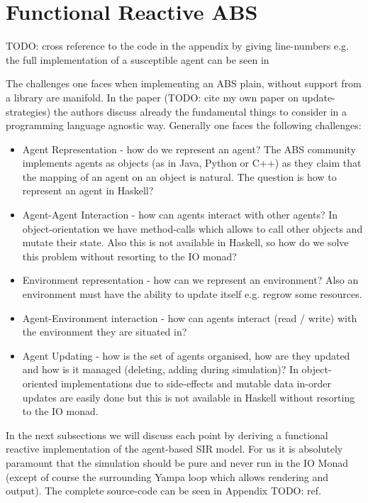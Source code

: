 \section{Functional Reactive ABS}
TODO: cross reference to the code in the appendix by giving line-numbers e.g. the full implementation of a susceptible agent can be seen in

The challenges one faces when implementing an ABS plain, without support from a library are manifold. In the paper (TODO: cite my own paper on update-strategies) the authors discuss already the fundamental things to consider in a programming language agnostic way.  Generally one faces the following challenges:

\begin{itemize}
	\item Agent Representation - how do we represent an agent? The ABS community implements agents as objects (as in Java, Python or C++) as they claim that the mapping of an agent on an object is natural. The question is how to represent an agent in Haskell?
	\item Agent-Agent Interaction - how can agents interact with other agents? In object-orientation we have method-calls which allows to call other objects and mutate their state. Also this is not available in Haskell, so how do we solve this problem without resorting to the IO monad?
	\item Environment representation - how can we represent an environment? Also an environment must have the ability to update itself e.g. regrow some resources.
	\item Agent-Environment interaction - how can agents interact (read / write) with the environment they are situated in?
	\item Agent Updating - how is the set of agents organised, how are they updated and how is it managed (deleting, adding during simulation)? In object-oriented implementations due to side-effects and mutable data in-order updates are easily done but this is not available in Haskell without resorting to the IO monad.
\end{itemize}

In the next subsections we will discuss each point by deriving a functional reactive implementation of the agent-based SIR model. For us it is absolutely paramount that the simulation should be pure and never run in the IO Monad (except of course the surrounding Yampa loop which allows rendering and output). The complete source-code can be seen in Appendix TODO: ref. 

